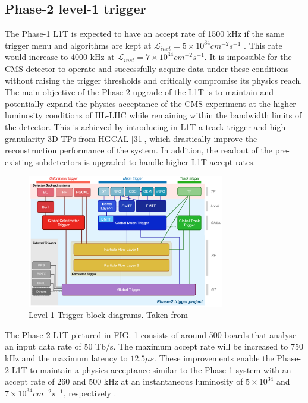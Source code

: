 \documentclass[../../main.tex]{subfiles}
\begin{document}
\subsection{Phase-2 level-1 trigger}
\label{Phase-2_l1T}

The Phase-1 L1T is expected to have an accept rate of 1500 kHz if the same trigger menu and algorithms are kept at $\mathcal{L}_{inst} = 5 \times 10^{34} cm^{-2} s^{-1}$ \cite{L1T-2up}. This rate would increase to 4000 kHz at $\mathcal{L}_{inst} = 7 \times 10^{34} cm^{-2} s^{-1}$. It is impossible for the CMS detector to operate and successfully acquire data under these conditions without raising the trigger thresholds and critically compromise its physics reach. The main objective of the Phase-2 upgrade of the L1T is to maintain and potentially expand the physics acceptance of the CMS experiment at the higher luminosity conditions of HL-LHC while remaining within the bandwidth limits of the detector. This is achieved by introducing in L1T a track trigger and high granularity 3D TPs from HGCAL [31], which drastically improve the reconstruction performance of the system. In addition, the readout of the pre-existing subdetectors is upgraded to handle higher L1T accept rates.  


\begin{figure}[h]
    \centering
    \includegraphics[width=0.77\textwidth]{sections/02/Images/Phase-2_l1t.png}
    \caption{Level 1 Trigger block diagrams. Taken from \cite{L1T-2up}}
    \label{fig:Phase-2_L1T}
\end{figure}


The Phase-2 L1T pictured in FIG. \ref{fig:Phase-2_L1T} consists of around 500 boards that analyse an input data rate of 50 Tb/s. The maximum accept rate will be increased to 750 kHz and the maximum latency to $12.5 \mu s$. These improvements enable the Phase-2 L1T to maintain a physics acceptance similar to the Phase-1 system with an accept rate of 260 and 500 kHz at an instantaneous luminosity of $5 \times 10^{34}$ and $ 7 \times 10^{34} cm^{-2} s^{-1}$, respectively \cite{L1T-2up}.  
\end{document}
